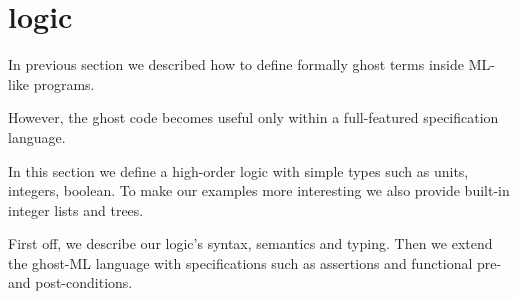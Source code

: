 \newpage
\section{logic} 





 In previous section we described how to define formally ghost terms inside
 ML-like programs. 
 
 However, the ghost code becomes useful only within a full-featured 
 specification language.
 
 In this section we define a high-order logic with simple types such as units, 
 integers, boolean. To make our examples more interesting we also provide 
 built-in integer lists and trees.
 
 First off, we describe our logic's syntax, semantics and typing. Then
 we extend the ghost-ML language with specifications such as assertions
 and functional pre- and post-conditions.
 
